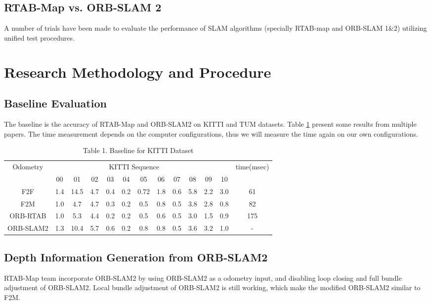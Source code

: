 \documentclass[12pt]{article}
\begin{document}
\subsection{RTAB-Map vs. ORB-SLAM 2}
A number of trials have been made to evaluate the performance of SLAM algorithms (specially RTAB-map and ORB-SLAM 1\&2)  utilizing unified test procedures. 

\section{Research Methodology and Procedure}
\subsection{Baseline Evaluation}
The baseline is the accuracy of RTAB-Map and ORB-SLAM2 on KITTI and TUM datasets. Table \ref{tab:my-table} present some results from multiple papers. The time measurement depends on the computer configurations, thus we will measure the time again on our own configurations. 
\begin{table}[]
    \centering
    \begin{tabular}{@{}ccccccccccccc@{}}
    \toprule
    Odometry  & \multicolumn{10}{c}{KITTI Sequence}                         &     & time(msec)   \\
              & 00  & 01   & 02  & 03  & 04  & 05   & 06  & 07  & 08  & 09  & 10  &     \\ \midrule
    F2F       & 1.4 & 14.5 & 4.7 & 0.4 & 0.2 & 0.72 & 1.8 & 0.6 & 5.8 & 2.2 & 3.0 & 61  \\ \midrule
    F2M       & 1.0 & 4.7  & 4.7 & 0.3 & 0.2 & 0.5  & 0.8 & 0.5 & 3.8 & 2.8 & 0.8 & 82  \\ \midrule
    ORB-RTAB  & 1.0 & 5.3  & 4.4 & 0.2 & 0.2 & 0.5  & 0.6 & 0.5 & 3.0 & 1.5 & 0.9 & 175 \\ \midrule
    ORB-SLAM2 & 1.3 & 10.4 & 5.7 & 0.6 & 0.2 & 0.8  & 0.8 & 0.5 & 3.6 & 3.2 & 1.0 & -   \\ \bottomrule
    \end{tabular}
    \caption{Table 1. Baseline for KITTI Dataset}
    \label{tab:my-table}
    \end{table}

\subsection{Depth Information Generation from ORB-SLAM2}
RTAB-Map team incorporate ORB-SLAM2 by using ORB-SLAM2 as a odometry input, and disabling loop closing and full bundle adjustment of ORB-SLAM2. Local bundle adjustment of ORB-SLAM2 is still working, which make the modified ORB-SLAM2 similar to F2M. 
\end{document}
